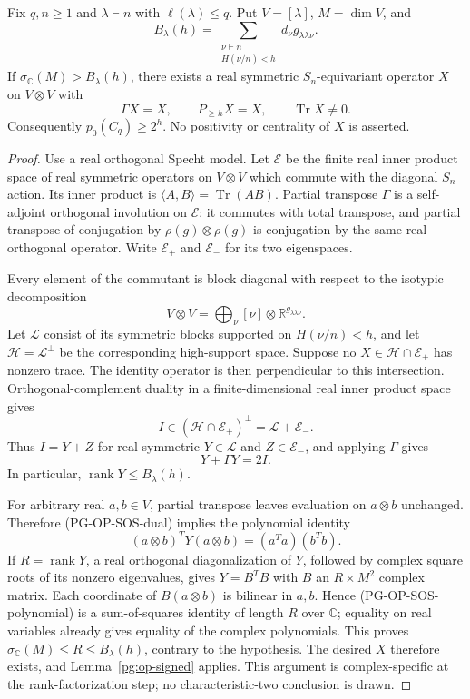 \begin{proposition}
\label{pg:op-sos-duality}
Fix $q,n\geq1$ and $\lambda\vdash n$ with $\ell(\lambda)\leq q$.
Put $V=[\lambda]$, $M=\dim V$, and
\[
 B_{\lambda}(h)=
 \sum_{\substack{\nu\vdash n\\H(\nu/n)<h}}
       d_\nu g_{\lambda\lambda\nu}.
\]
If $\sigma_{\mathbb C}(M)>B_{\lambda}(h)$, there exists a real symmetric
$S_n$-equivariant operator $X$ on $V\otimes V$ with
\[
 \Gamma X=X,\qquad P_{\geq h}X=X,\qquad
 \operatorname{Tr}X\ne0.
 \tag{PG-OP-SOS-witness}
\]
Consequently $p_0(C_q)\geq2^h$. No positivity or centrality of $X$ is
asserted.
\end{proposition}
\begin{proof}
Use a real orthogonal Specht model. Let $\mathcal E$ be the finite
real inner product space of real symmetric operators on $V\otimes V$
which commute with the diagonal $S_n$ action. Its inner product is
$\langle A,B\rangle=\operatorname{Tr}(AB)$. Partial transpose $\Gamma$
is a self-adjoint orthogonal involution on $\mathcal E$: it commutes
with total transpose, and partial transpose of conjugation by
$\rho(g)\otimes\rho(g)$ is conjugation by the same real orthogonal
operator. Write $\mathcal E_+$ and $\mathcal E_-$ for its two
eigenspaces.

Every element of the commutant is block diagonal with respect to the
isotypic decomposition
\[
 V\otimes V=\bigoplus_\nu [\nu]\otimes
                              \mathbb R^{g_{\lambda\lambda\nu}}.
\]
Let $\mathcal L$ consist of its symmetric blocks supported on
$H(\nu/n)<h$, and let $\mathcal H=\mathcal L^\perp$ be the corresponding
high-support space. Suppose no $X\in\mathcal H\cap\mathcal E_+$ has
nonzero trace. The identity operator is then perpendicular to this
intersection. Orthogonal-complement duality in a finite-dimensional
real inner product space gives
\[
 I\in(\mathcal H\cap\mathcal E_+)^\perp
   =\mathcal L+\mathcal E_-.
\]
Thus $I=Y+Z$ for real symmetric $Y\in\mathcal L$ and
$Z\in\mathcal E_-$, and applying $\Gamma$ gives
\[
 Y+\Gamma Y=2I.
 \tag{PG-OP-SOS-dual}
\]
In particular, $\operatorname{rank}Y\leq B_\lambda(h)$.

For arbitrary real $a,b\in V$, partial transpose leaves evaluation on
$a\otimes b$ unchanged. Therefore (PG-OP-SOS-dual) implies the polynomial
identity
\[
 (a\otimes b)^TY(a\otimes b)
       =(a^Ta)(b^Tb).
 \tag{PG-OP-SOS-polynomial}
\]
If $R=\operatorname{rank}Y$, a real orthogonal diagonalization of $Y$,
followed by complex square roots of its nonzero eigenvalues, gives
$Y=B^TB$ with $B$ an $R\times M^2$ complex matrix. Each coordinate of
$B(a\otimes b)$ is bilinear in $a,b$. Hence (PG-OP-SOS-polynomial)
is a sum-of-squares identity of length $R$ over $\mathbb C$; equality on
real variables already gives equality of the complex polynomials.
This proves
$\sigma_{\mathbb C}(M)\leq R\leq B_\lambda(h)$, contrary to the
hypothesis. The desired $X$ therefore exists, and
Lemma~\ref{pg:op-signed} applies. This argument is complex-specific at
the rank-factorization step; no characteristic-two conclusion is drawn.
\end{proof}

